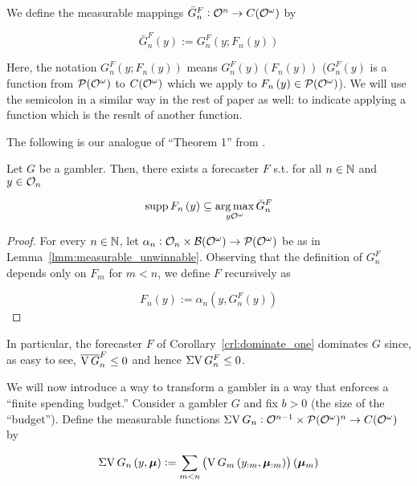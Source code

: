 We define the measurable mappings $\bar{G}^F_n: \mathcal{O}^n \rightarrow C(\mathcal{O}^\omega)$ by

\begin{equation}
\bar{G}^F_n\left(y\right) := G^F_n\left(y;F_n\left(y\right)\right)
\end{equation}

Here, the notation $G^F_n\left(y;F_n\left(y\right)\right)$ means $G^F_n(y)\left(F_n\left(y\right)\right)$ ($G^F_n(y)$ is a function from $\mathcal{P}(\mathcal{O}^\omega)$ to $C(\mathcal{O}^\omega)$ which we apply to $F_n\left(y\right)\in\mathcal{P}(\mathcal{O}^\omega)$). We will use the semicolon in a similar way in the rest of paper as well: to indicate applying a function which is the result of another function.

The following is our analogue of \enquote{Theorem 1} from \cite{Vovk_2005}.

\begin{corollary}
\label{crl:dominate_one}

Let $G$ be a gambler. Then, there exists a forecaster $F$ s.t. for all $n \in \mathbb{N}$ and $y \in \mathcal{O}_n$

\begin{equation}
\operatorname{supp} F_n\left(y\right) \subseteq \underset{y\mathcal{O}^\omega}{\operatorname{arg\,max}}\, \bar{G}^F_n
\end{equation}

\end{corollary}

\begin{proof}

For every $n \in \mathbb{N}$, let $\alpha_n: \mathcal{O}_n \times \mathcal{B}(\mathcal{O}^\omega) \rightarrow \mathcal{P}(\mathcal{O}^\omega)$ be as in Lemma~\ref{lmm:measurable_unwinnable}. Observing that the definition of $G^F_n$ depends only on $F_m$ for $m < n$, we define $F$ recursively as

\[F_n\left(y\right):=\alpha_n\left(y,G^F_n\left(y\right)\right)\]
\end{proof}

In particular, the forecaster $F$ of Corollary~\ref{crl:dominate_one} dominates $G$ since, as easy to see, $\overline{\operatorname{V} G}^F_n \leq 0$ and hence $\operatorname{\Sigma V} G^F_n \leq 0$.

We will now introduce a way to transform a gambler in a way that enforces a \enquote{finite spending budget.} Consider a gambler $G$ and fix $b > 0$ (the size of the \enquote{budget}). Define the measurable functions $\operatorname{\Sigma V} G_n: \mathcal{O}^{n-1} \times \mathcal{P}(\mathcal{O}^\omega)^n  \rightarrow C(\mathcal{O}^\omega)$ by

\begin{equation}
\operatorname{\Sigma V} G_n\left(y,\bm{\mu}\right) := \sum_{m < n} \left(\operatorname{V} G_m\left(y_{:m},\bm{\mu}_{:m}\right)\right)\left(\bm{\mu}_m\right)
\end{equation}

